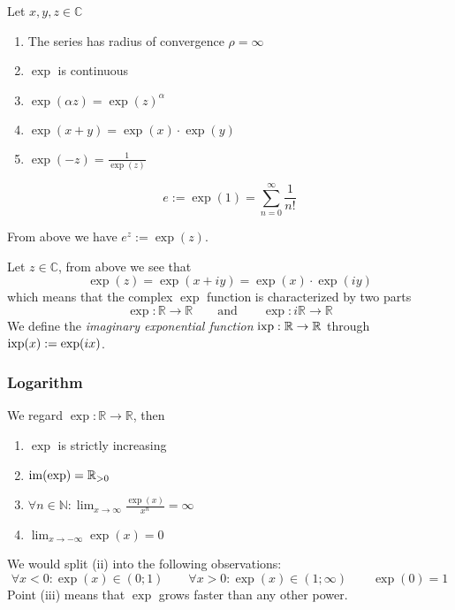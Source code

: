 \begin{proposition}[Properties]
   Let \(x, y, z \in \mathbb{C}\)
   \begin{enumerate}[label=\roman*, align=Center]
      \item The series has radius of convergence \(\rho = \infty\)
      \item \(\exp\) is continuous
      \item \(\exp(\alpha z) = \exp(z)^\alpha\)
      \item \(\exp(x + y) = \exp(x) \cdot \exp(y)\)
      \item \(\exp(-z) = \frac{1}{\exp(z)}\)
   \end{enumerate}
\end{proposition}

\begin{definition}
   \[e := \exp(1) = \sum_{n=0}^\infty \frac{1}{n!}\]
\end{definition}
\begin{remark}[Notation]
   From above we have \(e^z := \exp(z)\).
\end{remark}

Let \(z \in \mathbb{C}\), from above we see that
\[\exp(z) = \exp(x + iy) = \exp(x) \cdot \exp(iy)\]
which means that the complex \(\exp\) function is characterized by two parts
\[\exp: \mathbb{R} \to \mathbb{R} \qquad\text{and}\qquad \exp: i\mathbb{R} \to \mathbb{R}\]
We define the \emph{imaginary exponential function} \(\operatorname{ixp}: \mathbb{R} \to \mathbb{R}\) through \(\operatorname{ixp}(x) := \exp(ix)\).

\subsubsection{Logarithm}
\begin{proposition}
   We regard \(\exp: \mathbb{R} \to \mathbb{R}\), then
   \begin{enumerate}[label=\roman*, align=Center]
      \item \(\exp\) is strictly increasing
      \item \(\operatorname{im}(\exp) = \mathbb{R}_{>0}\)
      \item \(\forall n \in \mathbb{N}: \lim_{x \to \infty} \frac{\exp(x)}{x^n} = \infty\)
      \item \(\lim_{x \to -\infty} \exp(x) = 0\)
   \end{enumerate}
\end{proposition}
\begin{remark}[Intuition]
   We would split (ii) into the following observations:
   \[\forall x < 0: \exp(x) \in (0; 1) \qquad \forall x > 0: \exp(x) \in (1; \infty) \qquad \exp(0) = 1\]
   Point (iii) means that \(\exp\) grows faster than any other power.
\end{remark}

